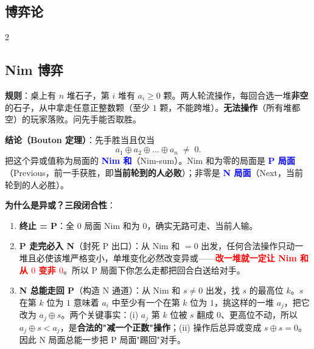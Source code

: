 	\begin{center}
		\section{博弈论}
	\end{center}

	\begin{multicols*}{2}

		\subsection{Nim 博弈}

		\textbf{规则}：桌上有 $n$ 堆石子，第 $i$ 堆有 $a_i \ge 0$ 颗。两人轮流操作，每回合选一堆\textbf{非空}的石子，从中拿走任意正整数颗（至少 $1$ 颗，不能跨堆）。\textbf{无法操作}（所有堆都空）的玩家落败。问先手能否取胜。

		\textbf{结论（Bouton 定理）}：先手胜当且仅当
		\[
			a_1 \oplus a_2 \oplus \dots \oplus a_n \;\neq\; 0.
		\]
		把这个异或值称为局面的 \textcolor{blue}{\textbf{Nim 和}}（Nim-sum）。Nim 和为零的局面是 \textcolor{blue}{\textbf{P 局面}}（Previous，前一手获胜，即\textbf{当前轮到的人必败}）；非零是 \textcolor{blue}{\textbf{N 局面}}（Next，当前轮到的人必胜）。

		\textbf{为什么是异或？三段闭合性}：

		\begin{enumerate}
			\item \textbf{终止 = P}：全 $0$ 局面 Nim 和为 $0$，确实无路可走、当前人输。
			\item \textbf{P 走完必入 N}（封死 P 出口）：从 Nim 和 $=0$ 出发，任何合法操作只动一堆且必使该堆严格变小，单堆变化必然改变异或——\textcolor{red}{\textbf{改一堆就一定让 Nim 和从 $0$ 变非 $0$}}。所以 P 局面下你怎么走都把回合白送给对手。
			\item \textbf{N 总能走回 P}（构造 N 通道）：从 Nim 和 $s \neq 0$ 出发，找 $s$ 的最高位 $k$。$s$ 在第 $k$ 位为 $1$ 意味着 $a_i$ 中至少有一个在第 $k$ 位为 $1$，挑这样的一堆 $a_j$，把它改为 $a_j \oplus s$。两个关键事实：(i) $a_j$ 第 $k$ 位被 $s$ 翻成 $0$、更高位不动，所以 $a_j \oplus s < a_j$，是\textbf{合法的"减一个正数"操作}；(ii) 操作后总异或变成 $s \oplus s = 0$。因此 N 局面总能一步把 P 局面"踢回"对手。
		\end{enumerate}


\end{multicols*}
